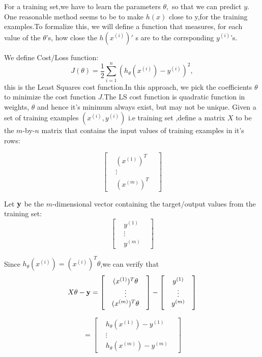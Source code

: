 \documentclass[12pt]{article}
\begin{document}
For a training set,we have to  learn the parameters $\theta,$ so that we can predict $y$. One reasonable method seems to be to make $h(x)$ close to y,for the training examples.To formalize this, we will define a function that measures, for each value of the $\theta$'s, how close the $h(x^{(i)})'$ s are to the corrsponding $y^{(i)}$'s.

We  define Cost/Loss function: $$J(\theta)=\frac{1}{2}\sum_{i=1}^{n}(h_{\theta}(x^{(i)})-y^{(i)})^{2},$$this is the Least Squares cost function.In this approach, we pick the coefficients $\theta$ to minimize the cost function $J$.The LS cost function is quadratic function in weights, $\theta$ and hence it's minimum always exist, but may not be unique.
Given a set of training examples $(x^{(i)},y^{(i)})$ i.e training set ,define a matrix $X$ to be the $m$-by-$n$ matrix  that contains the input values of training examples in it's rows:  

 $$ \begin{bmatrix} 
  & {(x^{(1)})^{T}} &  \\
  & \vdots & \\
  &   (x^{(m)})^{T}     &  
  \end{bmatrix} $$
 
 
Let $ \textbf y$ be the $m$-dimensional vector containing the target/output values from the training set:
 $$\begin{bmatrix} 
 & y^{(1)} &  \\
 & \vdots & \\
 &   y^{(m)}     &  
 \end{bmatrix}$$
 
 
Since $h_{\theta}(x^{(i)})=(x^{(i)})^{T}\theta$,we can verify that
 $$X \theta - \textbf y = \begin{bmatrix} 
 & {(x^{(1)})^{T}}\theta &  \\
 & \vdots & \\
 &   (x^{(m)})^{T} \theta    &  
 \end{bmatrix} - \begin{bmatrix} 
 & y^{(1)} &  \\
 & \vdots & \\
 &   y^{(m)}     &  
 \end{bmatrix}$$
 
 $$=\begin{bmatrix} 
 & h_{\theta}(x^{(1)})-y^{(1)} &  \\
 & \vdots & \\
 &  h_{\theta}(x^{(m)})- y^{(m)}     &  
 \end{bmatrix}$$
 
\end{document}
